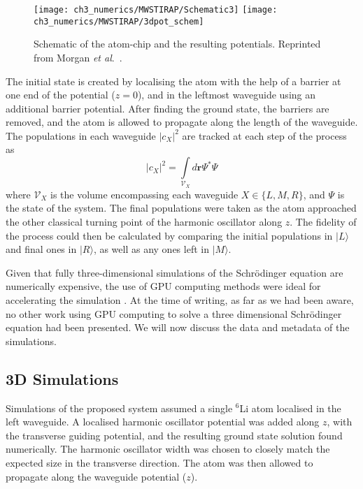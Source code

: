 \begin{figure}[tb]
    \centering
  \texttt{[image: ch3\_numerics/MWSTIRAP/Schematic3]}
  \texttt{[image: ch3\_numerics/MWSTIRAP/3dpot\_schem]}
  \caption{Schematic of the atom-chip and the resulting potentials. Reprinted from Morgan {\textit{et al}.}~\cite{AO:Morgan_pra_2013}.}
  \label{fig:schematic_atom-chip}
\end{figure}

The initial state is created by localising the atom with the help of a barrier at one end of the potential ($z=0$), and in the leftmost waveguide using an additional barrier potential. After finding the ground state, the barriers are removed, and the atom is allowed to propagate along the length of the waveguide. The populations in each waveguide $|c_{X}|^2$ are tracked at each step of the process as
\begin{equation}
    |c_X|^2 = \int\limits_{\mathcal{V}_X} d\mathbf{r}  \Psi^{*} \Psi
\end{equation}
where $\mathcal{V}_X$ is the volume encompassing each waveguide $X \in \{L,M,R\}$, and $\Psi$ is the state of the system.
The final populations were taken as the atom approached the other classical turning point of the harmonic oscillator along $z$. The fidelity of the process could then be calculated by comparing the initial populations in $| L \rangle$ and final ones in $|R \rangle$, as well as any ones left in $| M \rangle$.

Given that fully three-dimensional simulations of the Schr\"odinger equation are numerically expensive, the use of GPU computing methods were ideal for accelerating the simulation \cite{Num:Bauke_cpc_2011}. At the time of writing, as far as we had been aware, no other work using GPU computing to solve a three dimensional Schr\"odinger equation had been presented. We will now discuss the data and metadata of the simulations.

\subsection{3D Simulations}
\label{sec:Results}

Simulations of the proposed system assumed a single $^{6}$Li atom localised in the left waveguide. A localised harmonic oscillator potential was added along $z$, with the transverse guiding potential, and the resulting ground state solution found numerically. The harmonic oscillator width was chosen to closely match the expected size in the transverse direction. The atom was then allowed to propagate along the waveguide potential ($z$).

